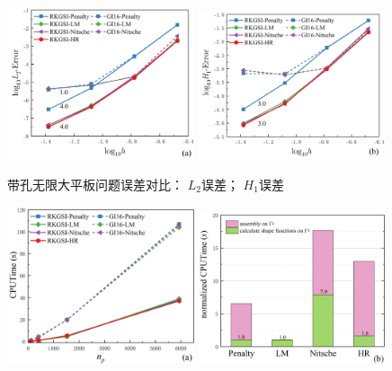 \newpage
\begin{figure}[H]
\centering
\begin{subcaptiongroup}
        \includegraphics[width=0.49\textwidth]{figure/EHR/hole/L2.png}
        \label{EHL2}
        \includegraphics[width=0.49\textwidth]{figure/EHR/hole/H1.png}
        \label{EHH1}
        \end{subcaptiongroup}
    \caption{带孔无限大平板问题误差对比： $L_2$误差； $H_1$误差}
    \label{EHLH}
    \end{figure}
\begin{figure}[H]
\centering
    \begin{subcaptiongroup}
    \includegraphics[width=0.49\textwidth]{figure/EHR/hole/cputime.png}
    \label{Hcputime}
    \includegraphics[width=0.49\textwidth]{figure/EHR/hole/efficiency.png}
    \label{Hefficiency}
\end{subcaptiongroup}
\caption{}
\end{figure} 
